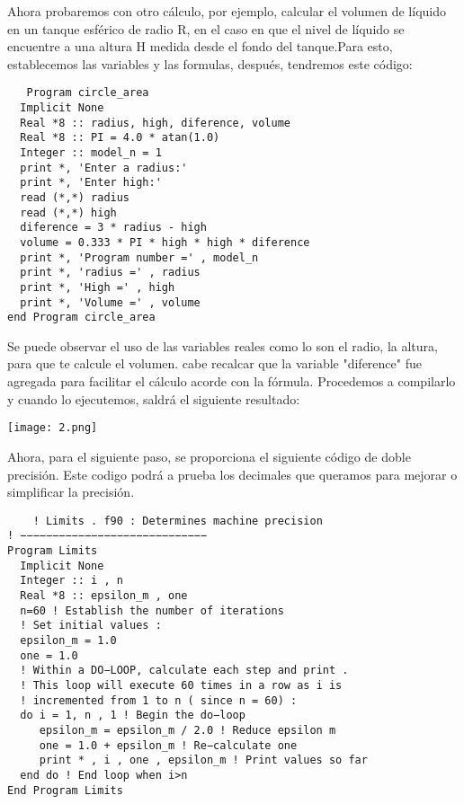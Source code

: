 \documentclass[12pt]{article}
\begin{document}
	\vspace{2cm}

Ahora probaremos con otro cálculo, por ejemplo, calcular el volumen de líquido en un tanque esférico de radio R, en el caso en que el nivel de líquido se encuentre a una altura H medida desde el fondo del tanque.Para esto, establecemos las variables y las formulas, después, tendremos este código:

\begin{verbatim}
   Program circle_area
  Implicit None
  Real *8 :: radius, high, diference, volume
  Real *8 :: PI = 4.0 * atan(1.0)
  Integer :: model_n = 1
  print *, 'Enter a radius:'
  print *, 'Enter high:'
  read (*,*) radius
  read (*,*) high
  diference = 3 * radius - high
  volume = 0.333 * PI * high * high * diference
  print *, 'Program number =' , model_n
  print *, 'radius =' , radius
  print *, 'High =' , high
  print *, 'Volume =' , volume
end Program circle_area 
\end{verbatim}

Se puede observar el uso de las variables reales como lo son el radio, la altura, para que te calcule el volumen. cabe recalcar que la variable "diference" fue agregada para facilitar el cálculo acorde con la fórmula.
Procedemos a compilarlo y cuando lo ejecutemos, saldrá el siguiente resultado:
\begin{center}
\texttt{[image: 2.png]}\\
\end{center}

Ahora, para el siguiente paso, se proporciona el siguiente código de doble precisión. Este codigo podrá a prueba los decimales que queramos para mejorar o simplificar la precisión.

\begin{verbatim}
	! Limits . f90 : Determines machine precision
! −−−−−−−−−−−−−−−−−−−−−−−−−−−−−
Program Limits
  Implicit None
  Integer :: i , n
  Real *8 :: epsilon_m , one
  n=60 ! Establish the number of iterations
  ! Set initial values :
  epsilon_m = 1.0
  one = 1.0
  ! Within a DO−LOOP, calculate each step and print .
  ! This loop will execute 60 times in a row as i is
  ! incremented from 1 to n ( since n = 60) :
  do i = 1, n , 1 ! Begin the do−loop
     epsilon_m = epsilon_m / 2.0 ! Reduce epsilon m
     one = 1.0 + epsilon_m ! Re−calculate one
     print * , i , one , epsilon_m ! Print values so far
  end do ! End loop when i>n
End Program Limits 
\end{verbatim}
\end{document}

